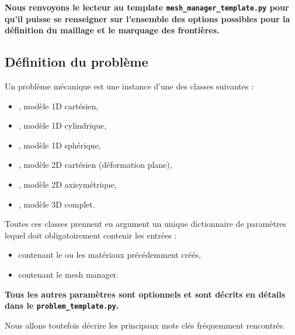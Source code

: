 \documentclass[10pt]{book}
\newenvironment{Encadre}[1]{
\par\medskip
\begin{tcolorbox}[colback=gray!10, colframe=lightgray, boxrule=1pt, arc=2pt]
\textbf{#1}
\end{tcolorbox}
\par\medskip
}{}
\begin{document}
\begin{Encadre}{
Nous renvoyons le lecteur au template \texttt{mesh\_manager\_template.py} pour qu'il puisse se renseigner sur l'ensemble des options possibles pour la définition du maillage et le marquage des frontières.
}\end{Encadre}

\subsection{Définition du problème} 
Un problème mécanique est une instance d'une des classes suivantes :
\begin{itemize}
\item {}, modèle 1D cartésien,
\item {}, modèle 1D cylindrique,
\item {}, modèle 1D sphérique,
\item {}, modèle 2D cartésien (déformation plane),
\item {}, modèle 2D axisymétrique,
\item {}, modèle 3D complet.
\end{itemize}
Toutes ces classes prennent en argument un unique dictionnaire de paramètres lequel doit obligatoirement contenir les entrées :
\begin{itemize}
\item {} contenant le ou les matériaux précédemment créés,
\item {} contenant le mesh manager. 
\end{itemize}
\begin{Encadre}{
Tous les autres paramètres sont optionnels et sont décrits en détails dans le \texttt{problem\_template.py}.
}\end{Encadre}
Nous allons toutefois décrire les principaux mots clés fréquemment rencontrés.
\end{document}
